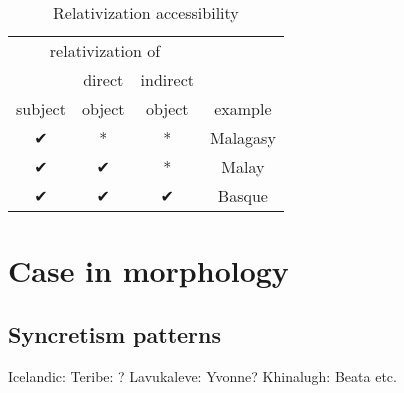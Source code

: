 \begin{table}[H]
   \center
   \caption {Relativization accessibility}
     \begin{tabular}{cccc}
       \toprule
             \multicolumn{3}{c}{relativization of}
           & \\
       \cmidrule{1-3}
             & direct
             & indirect
           & \\
             subject
             & object
             & object
           & example \\
       \cmidrule{1-3} \cmidrule{4-4}
             ✔
             & *
             & *
           & Malagasy \\
             ✔
             & ✔
             & *
           & Malay \\
             ✔
             & ✔
             & ✔
           & Basque \\
       \bottomrule
     \end{tabular}
 \end{table}






\section{Case in morphology}\label{sec:casemorphology}




\subsection{Syncretism patterns}

Icelandic: 
Teribe: ?
Lavukaleve: Yvonne?
Khinalugh: Beata etc.


